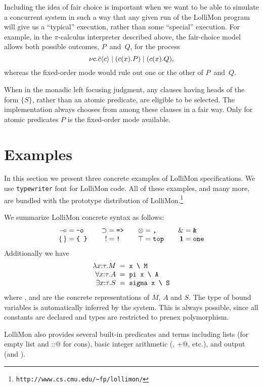 \documentclass{sig-alt}
\begin{document}
Including the idea of fair choice is important when we want to be
able to simulate a concurrent system in such a way that any given
run of the LolliMon program will give us a ``typical'' execution,
rather than some ``special'' execution.  For example, in the $\pi$-calculus
interpreter described above, the fair-choice model allows both
possible outcomes, $P$~and~$Q$, for the process
$$
  \nu c.\bar{c}\langle c\rangle \mid (c(x).P) \mid (c(x).Q),
$$
whereas the fixed-order mode
would
rule out one or the other of $P$~and~$Q$.

When in the monadic left focusing judgment, any clauses having heads
of the form $\{S\}$, rather than an atomic predicate, are eligible
to be selected.  The implementation
always chooses from among these clauses in a fair way. Only for atomic
predicates $P$ is the fixed-order mode available.

\section{Examples}
\label{sec:examples}
In this section we present three concrete examples of LolliMon
specifications.  We use \texttt{typewriter} font for LolliMon code.
All of these examples, and many more, are bundled with the prototype
distribution of LolliMon.\footnote{\texttt{http://www.cs.cmu.edu/\~{}fp/lollimon/}}

We summarize LolliMon concrete syntax as follows:
$$
\begin{array}{r@{{}={}}l@{\qquad}r@{{}={}}l@{\qquad}r@{{}={}}l@{\qquad}r@{{}={}}l}
\limp & \verb@-o@
&
\iimp & \verb@=>@
&
\tensor & \verb@,@
&
\with & \verb@&@
\\
\{\, \} & \verb@{ }@
&
\bang & \verb@!@
&
\top & \verb@top@
&
\one & \verb@one@
\end{array}
$$ 
Additionally we have
$$
\begin{array}{r@{\;\;=\;\;}l}
\lambda x{:}\tau.M
&
\verb@x \ M@
\\
\forall x{:}\tau.A
&
\verb@pi x \ A@
\\
\exists x{:}\tau.S
&
\verb@sigma x \ S@
\end{array}
$$ 
where \verb@M@, \verb@A@ and \verb@S@ are the concrete representations
of $M$, $A$ and $S$. The type of bound variables \verb@x@ is
automatically inferred by the system. This is always possible, since
all constants are declared and types are restricted to prenex
polymorphism.  

LolliMon also provides several built-in predicates and terms including
lists (\verb@nil@  for empty list and \verb@::@ for cons),
basic integer arithmetic (\verb@is@, \verb@+@, etc.),
and output (\verb@write@ and \verb@nl@).
\end{document}

